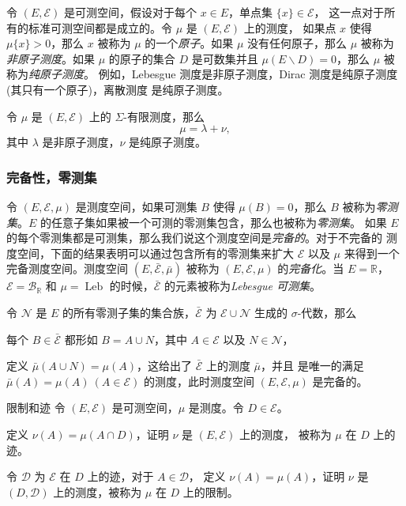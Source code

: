 \documentclass[fontset=none]{Notes}
\DeclareMathOperator\Leb{Leb}
\begin{document}
令 $(E,\mathcal{E})$ 是可测空间，假设对于每个 $x\in E$，单点集 $\{x\}\in \mathcal{E}$，
这一点对于所有的标准可测空间都是成立的。令 $\mu$ 是 $(E,\mathcal{E})$ 上的测度，
如果点 $x$ 使得 $\mu\{x\}>0$，那么 $x$ 被称为 $\mu$ 的一个\emph{原子}。如果 $\mu$
没有任何原子，那么 $\mu$ 被称为\emph{非原子测度}。如果 $\mu$ 的原子的集合 $D$
是可数集并且 $\mu(E \smallsetminus D)=0$，那么 $\mu$ 被称为\emph{纯原子测度}。
例如，Lebesgue 测度是非原子测度，Dirac 测度是纯原子测度(其只有一个原子)，离散测度
是纯原子测度。

\begin{proposition}
  令 $\mu$ 是 $(E,\mathcal{E})$ 上的 $\Sigma$-有限测度，那么
  \[
    \mu=\lambda+\nu,
  \]
  其中 $\lambda$ 是非原子测度，$\nu$ 是纯原子测度。
\end{proposition}


\subsubsection{完备性，零测集}

令 $(E,\mathcal{E},\mu)$ 是测度空间，如果可测集 $B$ 使得 $\mu(B)=0$，那么 $B$
被称为\emph{零测集}。$E$ 的任意子集如果被一个可测的零测集包含，那么也被称为\emph{零测集}。
如果 $E$ 的每个零测集都是可测集，那么我们说这个测度空间是\emph{完备的}。对于不完备的
测度空间，下面的结果表明可以通过包含所有的零测集来扩大 $\mathcal{E}$ 以及
$\mu$ 来得到一个完备测度空间。测度空间 $(E,\bar{\mathcal{E}},\bar\mu)$ 被称为
$(E,\mathcal{E},\mu)$ 的\emph{完备化}。当 $E=\mathbb{R}$，$\mathcal{E}=\mathcal{B}_{\mathbb{R}}$
和 $\mu=\Leb$ 的时候，$\bar{\mathcal{E}}$ 的元素被称为\emph{Lebesgue 可测集}。

\begin{proposition}
  令 $\mathcal{N}$ 是 $E$ 的所有零测子集的集合族，$\bar{\mathcal{E}}$ 为 $\mathcal{E}\cup \mathcal{N}$
  生成的 $\sigma$-代数，那么
  \begin{alphenum}[nosep]
    \item 每个 $B\in\bar{\mathcal{E}}$ 都形如 $B=A\cup N$，其中 $A\in \mathcal{E}$ 以及 $N\in \mathcal{N}$，
    \item 定义 $\bar\mu(A\cup N)=\mu(A)$，这给出了 $\bar{\mathcal{E}}$ 上的测度 $\bar\mu$，并且
    是唯一的满足 $\bar\mu(A)=\mu(A)\ (A\in \mathcal{E})$ 的测度，此时测度空间 $(E,\mathcal{E},\mu)$
    是完备的。
  \end{alphenum}
\end{proposition}

\begin{exercise}{限制和迹}{}
  令 $(E,\mathcal{E})$ 是可测空间，$\mu$ 是测度。令 $D\in \mathcal{E}$。
  \begin{alphenum}[nosep]
    \item 定义 $\nu(A)=\mu(A\cap D)$，证明 $\nu$ 是 $(E,\mathcal{E})$ 上的测度，
    被称为 $\mu$ 在 $D$ 上的迹。
    \item 令 $\mathcal{D}$ 为 $\mathcal{E}$ 在 $D$ 上的迹，对于 $A\in \mathcal{D}$，
    定义 $\nu(A)=\mu(A)$，证明 $\nu$ 是 $(D,\mathcal{D})$ 上的测度，被称为
    $\mu$ 在 $D$ 上的限制。
  \end{alphenum}
\end{exercise}
\end{document}
